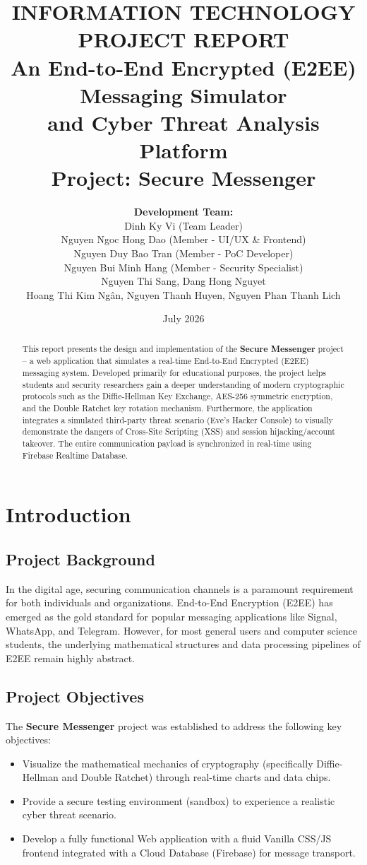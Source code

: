 \documentclass[12pt,a4paper]{article}
\title{
    \textbf{INFORMATION TECHNOLOGY PROJECT REPORT}\\
    [0.5cm]
    \Large{An End-to-End Encrypted (E2EE) Messaging Simulator \\ and Cyber Threat Analysis Platform}\\
    [1cm]
    \large{\textbf{Project: Secure Messenger}}
}
\author{
    \textbf{Development Team:} \\
    Dinh Ky Vi (Team Leader) \\
    Nguyen Ngoc Hong Dao (Member - UI/UX \& Frontend) \\
    Nguyen Duy Bao Tran (Member - PoC Developer) \\
    Nguyen Bui Minh Hang (Member - Security Specialist) \\
    Nguyen Thi Sang, Dang Hong Nguyet \\
    Hoang Thi Kim Ngân, Nguyen Thanh Huyen, Nguyen Phan Thanh Lich
}
\date{July 2026}
\begin{document}
\maketitle
\newpage

\begin{abstract}
This report presents the design and implementation of the \textbf{Secure Messenger} project -- a web application that simulates a real-time End-to-End Encrypted (E2EE) messaging system. Developed primarily for educational purposes, the project helps students and security researchers gain a deeper understanding of modern cryptographic protocols such as the Diffie-Hellman Key Exchange, AES-256 symmetric encryption, and the Double Ratchet key rotation mechanism. Furthermore, the application integrates a simulated third-party threat scenario (Eve's Hacker Console) to visually demonstrate the dangers of Cross-Site Scripting (XSS) and session hijacking/account takeover. The entire communication payload is synchronized in real-time using Firebase Realtime Database.
\end{abstract}

\tableofcontents
\newpage

\section{Introduction}
\subsection{Project Background}
In the digital age, securing communication channels is a paramount requirement for both individuals and organizations. End-to-End Encryption (E2EE) has emerged as the gold standard for popular messaging applications like Signal, WhatsApp, and Telegram. However, for most general users and computer science students, the underlying mathematical structures and data processing pipelines of E2EE remain highly abstract.

\subsection{Project Objectives}
The \textbf{Secure Messenger} project was established to address the following key objectives:
\begin{itemize}
    \item Visualize the mathematical mechanics of cryptography (specifically Diffie-Hellman and Double Ratchet) through real-time charts and data chips.
    \item Provide a secure testing environment (sandbox) to experience a realistic cyber threat scenario.
    \item Develop a fully functional Web application with a fluid Vanilla CSS/JS frontend integrated with a Cloud Database (Firebase) for message transport.
\end{itemize}
\end{document}
